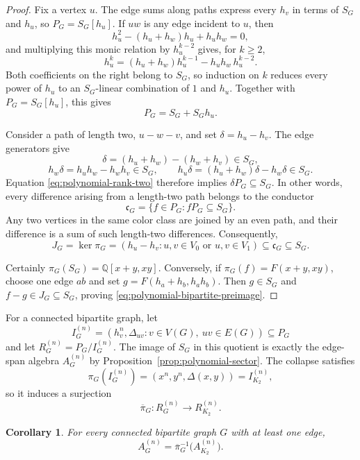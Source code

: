 \documentclass[11pt]{amsart}
\theoremstyle{plain}
\newtheorem{corollary}[theorem]{Corollary}
\theoremstyle{definition}
\theoremstyle{remark}
\newcommand{\Q}{\mathbb{Q}}
\begin{document}
\begin{proof}
Fix a vertex $u$.  The edge sums along paths express every $h_v$ in terms of
$S_G$ and $h_u$, so $P_G=S_G[h_u]$.  If $uw$ is any edge incident to $u$,
then
\[
  h_u^2-(h_u+h_w)h_u+h_uh_w=0,
\]
and multiplying this monic relation by $h_u^{k-2}$ gives, for $k\geq2$,
\[
  h_u^k=(h_u+h_w)h_u^{k-1}-h_uh_w\,h_u^{k-2}.
\]
Both coefficients on the right belong to $S_G$, so induction on $k$ reduces
every power of $h_u$ to an $S_G$-linear combination of $1$ and $h_u$.
Together with $P_G=S_G[h_u]$, this gives
\begin{equation}\label{eq:polynomial-rank-two}
  P_G=S_G+S_Gh_u.
\end{equation}

Consider a path of length two, $u-w-v$, and set $\delta=h_u-h_v$.  The edge
generators give
\[
  \delta=(h_u+h_w)-(h_w+h_v)\in S_G,
\]
\[
  h_w\delta=h_uh_w-h_wh_v\in S_G,
  \qquad
  h_u\delta=(h_u+h_w)\delta-h_w\delta\in S_G.
\]
Equation \eqref{eq:polynomial-rank-two} therefore implies
$\delta P_G\subseteq S_G$.  In other words, every difference arising from a
length-two path belongs to the conductor
\[
  \mathfrak c_G=\{f\in P_G:fP_G\subseteq S_G\}.
\]
Any two vertices in the same color class are joined by an even path, and
their difference is a sum of such length-two differences.  Consequently,
\[
  J_G=\ker\pi_G
  =(h_u-h_v:u,v\in V_0\text{ or }u,v\in V_1)
  \subseteq\mathfrak c_G\subseteq S_G.
\]

Certainly $\pi_G(S_G)=\Q[x+y,xy]$.  Conversely, if
$\pi_G(f)=F(x+y,xy)$, choose one edge $ab$ and set
$g=F(h_a+h_b,h_ah_b)$.  Then $g\in S_G$ and
$f-g\in J_G\subseteq S_G$, proving
\eqref{eq:polynomial-bipartite-preimage}.
\end{proof}

For a connected bipartite graph, let
\[
  I_G^{(n)}=(h_v^n,\Delta_{uv}:v\in V(G),\ uv\in E(G))\subseteq P_G
\]
and let $R_G^{(n)}=P_G/I_G^{(n)}$.  The image of $S_G$ in this quotient is
exactly the edge-span algebra $A_G^{(n)}$ by
Proposition~\ref{prop:polynomial-sector}.  The collapse
satisfies
\[
  \pi_G(I_G^{(n)})
  =(x^n,y^n,\Delta(x,y))=I_{K_2}^{(n)},
\]
so it induces a surjection
\[
  \overline\pi_G:R_G^{(n)}\longrightarrow R_{K_2}^{(n)}.
\]

\begin{corollary}\label{cor:bipartite-preimage}
For every connected bipartite graph $G$ with at least one edge,
\begin{equation}\label{eq:tree-bipartite-preimage}
  A_G^{(n)}
  =\overline\pi_G^{-1}\bigl(A_{K_2}^{(n)}\bigr).
\end{equation}
\end{corollary}
\end{document}
